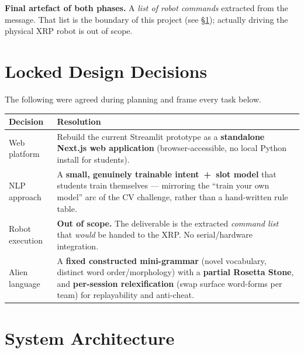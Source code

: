 \documentclass[a4]{article}
\begin{document}
\noindent\textbf{Final artefact of both phases.} A \emph{list of robot commands}
extracted from the message. That list is the boundary of this project (see
\S\ref{sec:decisions}); actually driving the physical XRP robot is out of scope.

\section{Locked Design Decisions}\label{sec:decisions}

The following were agreed during planning and frame every task below.

\begin{center}
\renewcommand{\arraystretch}{1.3}
\begin{tabularx}{\linewidth}{@{}p{3.4cm}X@{}}
\toprule
\textbf{Decision} & \textbf{Resolution} \\
\midrule
Web platform &
Rebuild the current Streamlit prototype as a \textbf{standalone Next.js web
application} (browser-accessible, no local Python install for students). \\

NLP approach &
A \textbf{small, genuinely trainable intent~+~slot model} that students train
themselves --- mirroring the ``train your own model'' arc of the CV challenge,
rather than a hand-written rule table. \\

Robot execution &
\textbf{Out of scope.} The deliverable is the extracted \emph{command list}
that \emph{would} be handed to the XRP. No serial/hardware integration. \\

Alien language &
A \textbf{fixed constructed mini-grammar} (novel vocabulary, distinct word
order/morphology) with a \textbf{partial Rosetta Stone}, and
\textbf{per-session relexification} (swap surface word-forms per team) for
replayability and anti-cheat. \\
\bottomrule
\end{tabularx}
\end{center}

\section{System Architecture}
\end{document}
